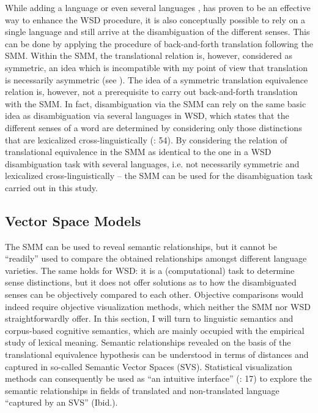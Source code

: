 While adding a language or even several languages \citep{gelbukh_five_2013}, has proven to be an effective way to enhance the WSD procedure, it is also conceptually possible to rely on a single language and still arrive at the disambiguation of the different senses. This can be done by applying the procedure of back-and-forth translation following the SMM. Within the SMM, the translational relation is, however, considered as symmetric, an idea which is incompatible with my point of view that translation is necessarily asymmetric (see ). The idea of a symmetric translation equivalence relation is, however, not a prerequisite to carry out back-and-forth translation with the SMM. In fact, disambiguation via the SMM can rely on the same basic idea as disambiguation via several languages in WSD, which states that the different senses of a word are determined by considering only those distinctions that are lexicalized cross-linguistically (\citealt{agirre_making_2007}: 54). By considering the relation of translational equivalence in the SMM as identical to the one in a WSD disambiguation task with several languages, i.e. not necessarily symmetric and lexicalized cross-linguistically – the SMM can be used for the disambiguation task carried out in this study.


\subsection{\label{sec:2.4.2}  Vector Space Models}

The SMM can be used to reveal semantic relationships, but it cannot be “readily” used to compare the obtained relationships amongst different language varieties. The same holds for WSD: it is a (computational) task to determine sense distinctions, but it does not offer solutions as to how the disambiguated senses can be objectively compared to each other. Objective comparisons would indeed require objective visualization methods, which neither the SMM nor WSD straightforwardly offer. In this section, I will turn to linguistic semantics and corpus-based cognitive semantics, which are mainly occupied with the empirical study of lexical meaning. Semantic relationships revealed on the basis of the translational equivalence hypothesis can be understood in terms of distances and captured in so-called Semantic Vector Spaces (SVS). Statistical visualization methods can consequently be used as “an intuitive interface” (\citealt{heylen_looking_2012}: 17) to explore the semantic relationships in fields of translated and non-translated language “captured by an SVS” (Ibid.).




